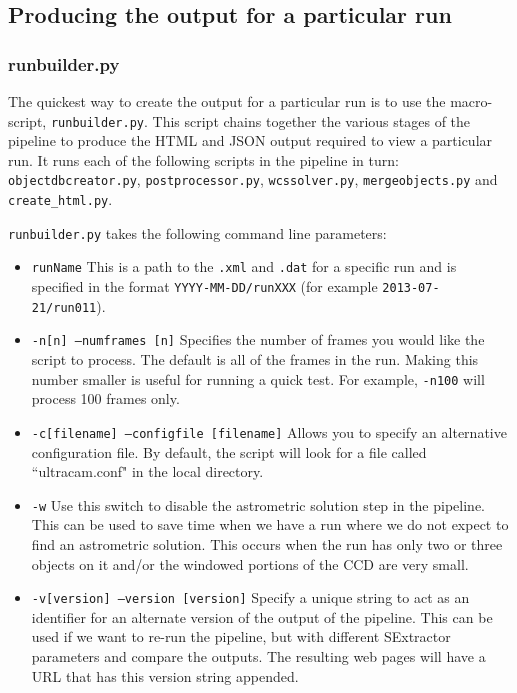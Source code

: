 \begin{itemize}
\end{itemize}

\subsection{Producing the output for a particular run}

\subsubsection{runbuilder.py}

The quickest way to create the output for a particular run is to use the macro-script, \texttt{runbuilder.py}. This script chains together the various stages of the pipeline to produce the HTML and JSON output required to view a particular run. It runs each of the following scripts in the pipeline in turn: \texttt{objectdbcreator.py}, \texttt{postprocessor.py}, \texttt{wcssolver.py}, \texttt{mergeobjects.py} and \texttt{create\_html.py}.

\texttt{runbuilder.py} takes the following command line parameters:
\begin{itemize}
  \item \texttt{runName} This is a path to the \texttt{.xml} and \texttt{.dat} for a specific run and is specified in the format \texttt{YYYY-MM-DD/runXXX}  (for example \texttt{2013-07-21/run011}).
  \item \texttt{-n[n] --numframes [n]} Specifies the number of frames you would like the script to process. The default is all of the frames in the run. Making this number smaller is useful for running a quick test. For example, \texttt{-n100} will process 100 frames only.
  \item \texttt{-c[filename] --configfile [filename]} Allows you to specify an alternative configuration file. By default, the script will look for a file called ``ultracam.conf" in the local directory. 
  \item \texttt{-w} Use this switch to disable the astrometric solution step in the pipeline. This can be used to save time when we have a run where we do not expect to find an astrometric solution. This occurs when the run has only two or three objects on it and/or the windowed portions of the CCD are very small.  
  \item \texttt{-v[version] --version [version]} Specify a unique string to act as an identifier for an alternate version of the output of the pipeline. This can be used if we want to re-run the pipeline, but with different SExtractor parameters and compare the outputs. The resulting web pages will have a URL that has this version string appended.    
\end{itemize}

